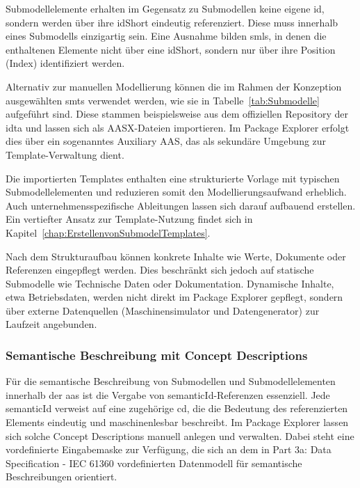 Submodellelemente erhalten im Gegensatz zu Submodellen keine eigene \acs{id}, sondern werden über ihre idShort eindeutig referenziert.
Diese muss innerhalb eines Submodells einzigartig sein.
Eine Ausnahme bilden \acsp{sml}, in denen die enthaltenen Elemente nicht über eine idShort, sondern nur über ihre Position (Index) identifiziert werden.

Alternativ zur manuellen Modellierung können die im Rahmen der Konzeption ausgewählten \acsp{smt} verwendet werden, wie sie in Tabelle~\ref{tab:Submodelle} aufgeführt sind.
Diese stammen beispielsweise aus dem offiziellen Repository der \acs{idta} \cite{idtaTemplates} und lassen sich als AASX-Dateien importieren.
Im Package Explorer erfolgt dies über ein sogenanntes Auxiliary AAS, das als sekundäre Umgebung zur Template-Verwaltung dient.

Die importierten Templates enthalten eine strukturierte Vorlage mit typischen Submodell\-elementen und reduzieren somit den Modellierungsaufwand erheblich.
Auch unternehmensspezifische Ableitungen lassen sich darauf aufbauend erstellen.
Ein vertiefter Ansatz zur Template-Nutzung findet sich in Kapitel~\ref{chap:ErstellenvonSubmodelTemplates}.

Nach dem Strukturaufbau können konkrete Inhalte wie Werte, Dokumente oder Referenzen eingepflegt werden.
Dies beschränkt sich jedoch auf statische Submodelle wie Technische Daten oder Dokumentation.
Dynamische Inhalte, etwa Betriebsdaten, werden nicht direkt im Package Explorer gepflegt, sondern über externe Datenquellen (Maschinensimulator und Datengenerator) zur Laufzeit angebunden.

\subsubsection*{Semantische Beschreibung mit Concept Descriptions}
\vspace{-0.5em}

Für die semantische Beschreibung von Submodellen und Submodellelementen innerhalb der \acs{aas} ist die Vergabe von semanticId-Referenzen essenziell.
Jede semanticId verweist auf eine zugehörige \acs{cd}, die die Bedeutung des referenzierten Elements eindeutig und maschinenlesbar beschreibt.
Im Package Explorer lassen sich solche Concept Descriptions manuell anlegen und verwalten.
Dabei steht eine vordefinierte Eingabemaske zur Verfügung, die sich an dem in Part 3a: Data Specification - IEC 61360 \cite{SpezifikationPart3a} vordefinierten Datenmodell für semantische Beschreibungen orientiert.

